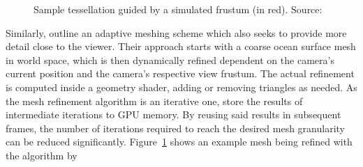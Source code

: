 \begin{figure}
{}
\hfill
{}
\caption{\textcolor{changed}{
Sample tessellation guided by a simulated frustum (in red). Source:~\citet{Centelles:2014}
}}
\label{fig:centelles:mesh}
\end{figure}
%
\textcolor{changed}{Similarly, \cite{Centelles:2014} outline an adaptive
meshing scheme which also seeks to provide more detail close to the viewer.
Their approach starts with a coarse ocean surface mesh in world space, which
is then dynamically refined dependent on the camera's current position and
the camera's  respective view frustum. The actual refinement is computed inside a geometry shader, adding or removing triangles as needed. As the mesh refinement
algorithm is an iterative one, \citeauthor{Centelles:2014} store the results of intermediate iterations to GPU memory. By reusing said results in subsequent frames, the number of iterations required to reach the desired mesh granularity
can be reduced significantly. Figure~\ref{fig:centelles:mesh} shows an example
mesh being refined with the algorithm by \citeauthor{Centelles:2014}}

